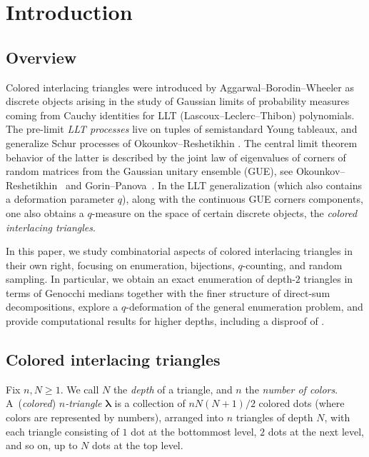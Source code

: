 \documentclass[pdftex]{sigma}
\numberwithin{equation}{section}
\theoremstyle{definition}
\begin{document}
\section{Introduction}
\label{sec:intro}

\subsection{Overview}

Colored interlacing triangles were introduced by Aggarwal--Borodin--Wheeler
\cite{ABW2023coloured_LLT} as discrete objects arising in the study of Gaussian
limits of probability measures coming from Cauchy identities for LLT
(Lascoux--Leclerc--Thibon) polynomials.
The pre-limit \emph{LLT processes} live on tuples of semistandard Young
tableaux, and generalize Schur processes of Okounkov--Reshetikhin
\cite{okounkov2003correlation}.
The central limit theorem behavior of the latter is described by the joint law
of eigenvalues of corners of random matrices from the Gaussian unitary ensemble
(GUE), see Okounkov--Reshetikhin~\cite{OkounkovReshetikhin2006RandomMatr} and
Gorin--Panova~\cite{GorinPanova2012_full}.
In the LLT generalization (which also contains a deformation parameter $q$),
along with the continuous GUE corners components, one also obtains a $q$-measure
on the space of certain discrete objects, the \emph{colored interlacing
triangles}.

In this paper, we study combinatorial aspects of colored interlacing triangles
in their own right, focusing on enumeration, bijections, $q$-counting, and
random sampling.
In particular, we obtain an exact enumeration of depth-$2$ triangles in terms of
Genocchi medians together with the finer structure of direct-sum
decompositions, explore a $q$-deformation of the general enumeration problem,
and provide computational results for higher depths, including a disproof of
\cite[Conjecture~A.5]{ABW2023coloured_LLT}.

\subsection{Colored interlacing triangles}

Fix $n,N\ge1$.
	We call $N$ the \emph{depth} of a triangle, and $n$ the \emph{number of
	colors}.
	A~(\emph{colored}) \emph{$n$\nobreakdash-triangle} $\boldsymbol\lambda$ is a
	collection of $nN(N+1)/2$ colored dots (where colors are represented by numbers), arranged
	into $n$ triangles of depth $N$, with each triangle consisting of $1$ dot at
	the bottommost level, $2$ dots at the next level, and so on, up to $N$ dots
	at the top level.
\end{document}
